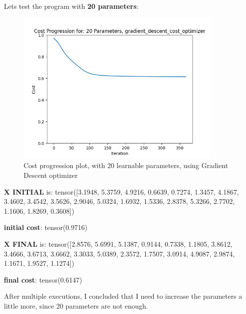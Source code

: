 \documentclass[inscr,ack,preface]{diphdthesis}
\begin{document}
Lets test the program with \textbf{20 parameters}: 

\begin{figure}[ht]
\begin{center}
    \includegraphics[width=0.9\textwidth]{20.png}
    \caption{Cost progression plot, with 20 learnable parameters, using Gradient Descent optimizer} 
    \label{fig:enter-label}
    \end{center}
\end{figure}

\textbf{X INITIAL} is: tensor([3.1948, 5.3759, 4.9216, 0.6639, 0.7274, 1.3457, 4.1867, 3.4602, 3.4542,
        3.5626, 2.9046, 5.0324, 1.6932, 1.5336, 2.8378, 5.3266, 2.7702, 1.1606,
        1.8269, 0.3608])

\textbf{initial cost}: tensor(0.9716)

\textbf{X FINAL} is: tensor([2.8576, 5.6991, 5.1387, 0.9144, 0.7338, 1.1805, 3.8612, 3.4666, 3.6713, 3.6662, 3.3033, 5.0389, 2.3572, 1.7507, 3.0914, 4.9087, 2.9874, 1.1671, 1.9527, 1.1274])

\textbf{final cost}: tensor(0.6147)


After multiple executions, I concluded that I need to increase the parameters a little more, since 20 parameters are not enough.
\end{document}
